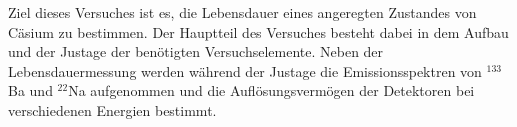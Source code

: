 Ziel dieses Versuches ist es, die Lebensdauer eines angeregten Zustandes von Cäsium zu bestimmen. Der Hauptteil des Versuches besteht dabei in dem Aufbau und der Justage der benötigten Versuchselemente. Neben der Lebensdauermessung werden während der Justage die Emissionsspektren von $^{133}$Ba und $^{22}$Na aufgenommen und die Auflösungsvermögen der Detektoren bei verschiedenen Energien bestimmt. 
